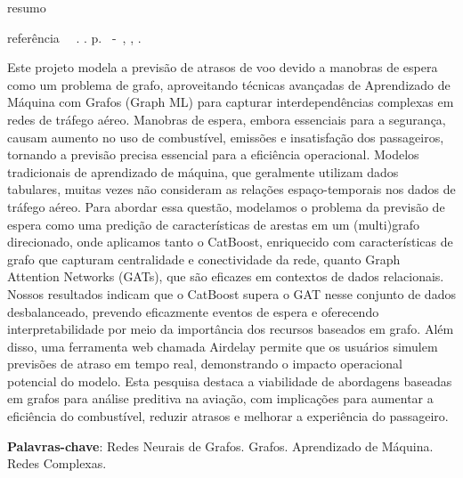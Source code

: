 \setlength{\absparsep}{18pt} %
resumo
\begin{resumo}
  \begin{flushleft}
    \setlength{\absparsep}{0pt} %
    referência \SingleSpacing
    \imprimirautorabr~~\textbf{\imprimirtituloresumo}. \imprimirdata. \pageref{LastPage}p.
    \imprimirtipotrabalho~-~\imprimirinstituicao,
    \imprimirlocal, \imprimirdata.
  \end{flushleft} \OnehalfSpacing

  Este projeto modela a previsão de atrasos de voo devido a manobras de
  espera como um problema de grafo, aproveitando técnicas avançadas de
  Aprendizado de Máquina com Grafos (Graph ML) para capturar
  interdependências complexas em redes de tráfego aéreo. Manobras de
  espera, embora essenciais para a segurança, causam aumento no uso de
  combustível, emissões e insatisfação dos passageiros, tornando a
  previsão precisa essencial para a eficiência operacional. Modelos
  tradicionais de aprendizado de máquina, que geralmente utilizam dados
  tabulares, muitas vezes não consideram as relações espaço-temporais
  nos dados de tráfego aéreo. Para abordar essa questão, modelamos o
  problema da previsão de espera como uma predição de características de
  arestas em um (multi)grafo direcionado, onde aplicamos tanto o
  CatBoost, enriquecido com características de grafo que capturam
  centralidade e conectividade da rede, quanto Graph Attention Networks
  (GATs), que são eficazes em contextos de dados relacionais. Nossos
  resultados indicam que o CatBoost supera o GAT nesse conjunto de dados
  desbalanceado, prevendo eficazmente eventos de espera e oferecendo
  interpretabilidade por meio da importância dos recursos baseados em
  grafo. Além disso, uma ferramenta web chamada Airdelay permite que os
  usuários simulem previsões de atraso em tempo real, demonstrando o
  impacto operacional potencial do modelo. Esta pesquisa destaca a
  viabilidade de abordagens baseadas em grafos para análise preditiva na
  aviação, com implicações para aumentar a eficiência do combustível,
  reduzir atrasos e melhorar a experiência do passageiro.

  \vspace{\onelineskip}

  \noindent \textbf{Palavras-chave}: Redes Neurais de
  Grafos. Grafos. Aprendizado de Máquina. Redes Complexas.


\end{resumo}
